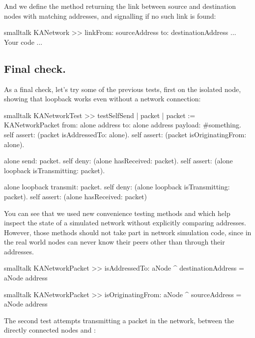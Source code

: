 \documentclass[10pt,twoside,english]{_support/latex/sbabook/sbabook}
\begin{document}
And we define the method  returning the link between source and destination nodes with matching addresses, and signalling  if no such link is found:

\begin{displaycode}{smalltalk}
KANetwork >> linkFrom: sourceAddress to: destinationAddress
    ... Your code ...
\end{displaycode}
\subsection{Final check. }
As a final check, let's try some of the previous tests, first on the isolated  node, showing that loopback works even without a network connection:

\begin{displaycode}{smalltalk}
KANetworkTest >> testSelfSend
    | packet |
    packet := KANetworkPacket
        from: alone address
        to: alone address
        payload: #something.
    self assert: (packet isAddressedTo: alone).
    self assert: (packet isOriginatingFrom: alone).

    alone send: packet.
    self deny: (alone hasReceived: packet).
    self assert: (alone loopback isTransmitting: packet).

    alone loopback transmit: packet.
    self deny: (alone loopback isTransmitting: packet).
    self assert: (alone hasReceived: packet)
\end{displaycode}

You can see that we used new convenience testing methods  and  which help inspect the state of a simulated network without explicitly comparing addresses.
However, those methods should not take part in network simulation code, since in the real world nodes can never know their peers other than through their addresses.

\begin{displaycode}{smalltalk}
KANetworkPacket >> isAddressedTo: aNode
    ^ destinationAddress = aNode address
\end{displaycode}

\begin{displaycode}{smalltalk}
KANetworkPacket >> isOriginatingFrom: aNode
    ^ sourceAddress = aNode address
\end{displaycode}

The second test attempts transmitting a packet in the network, between the directly connected nodes  and :
\end{document}
